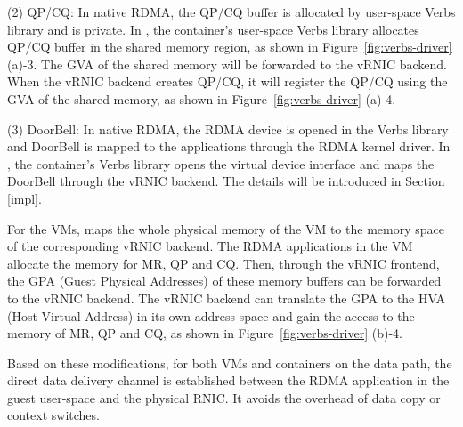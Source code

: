 (2) QP/CQ: In native RDMA, the QP/CQ buffer is allocated by user-space Verbs library and is private.
In \sys, the container's user-space Verbs library allocates QP/CQ buffer in the shared memory region, as shown in Figure~\ref{fig:verbs-driver} (a)-3. The GVA of the shared memory will be forwarded to the vRNIC backend. When the vRNIC backend creates QP/CQ, it will register the QP/CQ using the GVA of the shared memory, as shown in Figure~\ref{fig:verbs-driver} (a)-4.


(3) DoorBell: In native RDMA, the RDMA device is opened in the Verbs library and DoorBell is mapped to the applications through the RDMA kernel driver.
In \sys, the container's Verbs library opens the virtual device interface and maps the DoorBell through the vRNIC backend. The details will be introduced in Section \ref{impl}.


For the VMs, \sys maps the whole physical memory of the VM to the memory space of the corresponding vRNIC backend.
The RDMA applications in the VM allocate the memory for MR, QP and CQ. Then, through the vRNIC frontend, the GPA (Guest Physical Addresses) of these memory buffers can be forwarded to the vRNIC backend. The vRNIC backend can translate the GPA to the HVA (Host Virtual Address) in its own address space and gain the access to the memory of MR, QP and CQ, as shown in Figure~\ref{fig:verbs-driver} (b)-4.


Based on these modifications, for both VMs and containers on the data path, the direct data delivery channel is established between the RDMA application in the guest user-space and the physical RNIC. It avoids the overhead of data copy or context switches.

